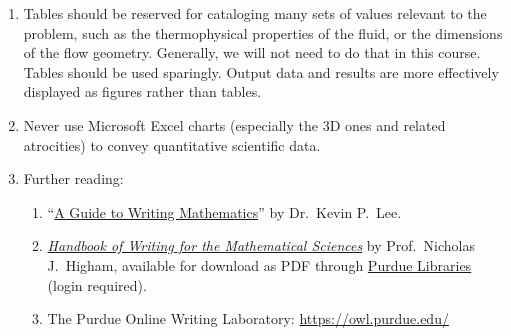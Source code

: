 \documentclass[11pt]{article}
\begin{document}
\begin{enumerate}
	\item Tables should be reserved for cataloging many sets of values relevant to the problem, such as the thermophysical properties of the fluid, or the dimensions of the flow geometry. Generally, we will not need to do that in this course. Tables should be used sparingly. Output data and results are more effectively displayed as figures rather than tables.

	\item Never use Microsoft Excel charts (especially the 3D ones and related atrocities) to convey quantitative scientific data.

	\item Further reading:

	\begin{enumerate}
		\item ``\href{http://www.cs.ucdavis.edu/~amenta/w10/writingman.pdf}{A Guide to Writing Mathematics}'' by Dr.\ Kevin P.\ Lee.

		\item \href{https://nhigham.com/handbook-of-writing-for-the-mathematical-sciences/}{\textit{Handbook of Writing for the Mathematical Sciences}} by Prof.\ Nicholas J.\ Higham, available for download as PDF through \href{https://purdue.primo.exlibrisgroup.com/permalink/01PURDUE_PUWL/ufs51j/alma99169877700501081}{Purdue Libraries} (login required).

		\item The Purdue Online Writing Laboratory: \url{https://owl.purdue.edu/}
	\end{enumerate}

\end{enumerate}
\end{document}
